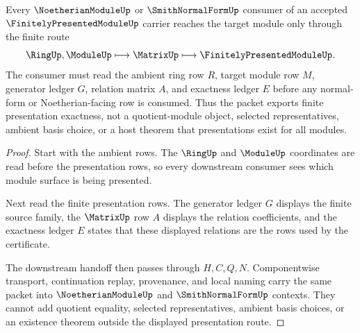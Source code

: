 \begin{theorem}
\label{thm:finitely-presented-module-presentation-exactness}
Every $\NoetherianModuleUp$ or $\SmithNormalFormUp$ consumer of an accepted $\FinitelyPresentedModuleUp$ carrier reaches the target module only through the finite route
$$
\RingUp,\ModuleUp \longmapsto \MatrixUp \longmapsto \FinitelyPresentedModuleUp .
$$
The consumer must read the ambient ring row $R$, target module row $M$, generator ledger $G$, relation matrix $A$, and exactness ledger $E$ before any normal-form or Noetherian-facing row is consumed. Thus the packet exports finite presentation exactness, not a quotient-module object, selected representatives, ambient basis choice, or a host theorem that presentations exist for all modules.
\end{theorem}
\begin{proof}
Start with the ambient rows. The $\RingUp$ and $\ModuleUp$ coordinates are read before the presentation rows, so every downstream consumer sees which module surface is being presented.

Next read the finite presentation rows. The generator ledger $G$ displays the finite source family, the $\MatrixUp$ row $A$ displays the relation coefficients, and the exactness ledger $E$ states that these displayed relations are the rows used by the certificate.

The downstream handoff then passes through $H,C,Q,N$. Componentwise transport, continuation replay, provenance, and local naming carry the same packet into $\NoetherianModuleUp$ and $\SmithNormalFormUp$ contexts. They cannot add quotient equality, selected representatives, ambient basis choices, or an existence theorem outside the displayed presentation route.
\end{proof}



